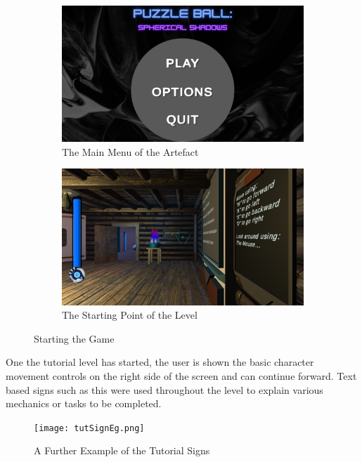 \begin{figure}[H]
\centering
\begin{subfigure}{0.5\textwidth}
  \centering
  \includegraphics[width=1\linewidth]{Figures/menu.png}
  \caption{The Main Menu of the Artefact}
\end{subfigure}%
\begin{subfigure}{0.5\textwidth}
  \centering
  \includegraphics[width=1\linewidth]{Figures/start.png}
  \caption{The Starting Point of the Level}
\end{subfigure}
\caption{Starting the Game}
\end{figure}

\noindent One the tutorial level has started, the user is shown the basic character movement controls on the right side of the screen and can continue forward. Text based signs such as this were used throughout the level to explain various mechanics or tasks to be completed.

\begin{figure}[H]
\centering
\centerline{\texttt{[image: tutSignEg.png]}}
\caption{A Further Example of the Tutorial Signs}
\end{figure}

